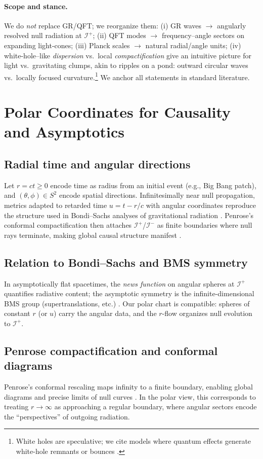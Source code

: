 \documentclass[12pt]{article}
\newcommand{\Iplus}{\mathcal{I}^+}
\newcommand{\Iminus}{\mathcal{I}^-}
\begin{document}
\paragraph{Scope and stance.}
We do \emph{not} replace GR/QFT; we reorganize them: (i) GR waves $\to$ angularly resolved null radiation at $\Iplus$; (ii) QFT modes $\to$ frequency–angle sectors on expanding light-cones; (iii) Planck scales $\to$ natural radial/angle units; (iv) white-hole–like \emph{dispersion} vs.\ local \emph{compactification} give an intuitive picture for light vs.\ gravitating clumps, akin to ripples on a pond: outward circular waves vs.\ locally focused curvature.\footnote{White holes are speculative; we cite models where quantum effects generate white-hole remnants or bounces \citep{deLorenzo2016}.} We anchor all statements in standard literature.

\section{Polar Coordinates for Causality and Asymptotics}
\subsection{Radial time and angular directions}
Let $r=ct\ge 0$ encode time as radius from an initial event (e.g., Big Bang patch), and $(\theta,\phi)\in S^2$ encode spatial directions. Infinitesimally near null propagation, metrics adapted to retarded time $u=t-r/c$ with angular coordinates reproduce the structure used in Bondi–Sachs analyses of gravitational radiation \citep{Bondi1962,Sachs1962,BMS,NullInfinity}. Penrose’s conformal compactification then attaches $\Iplus$/$\Iminus$ as finite boundaries where null rays terminate, making global causal structure manifest \citep{Penrose1964,NullInfinity,AsympFlat}.

\subsection{Relation to Bondi–Sachs and BMS symmetry}
In asymptotically flat spacetimes, the \emph{news function} on angular spheres at $\Iplus$ quantifies radiative content; the asymptotic symmetry is the infinite-dimensional BMS group (supertranslations, etc.) \citep{Bondi1962,Sachs1962,BMS}. Our polar chart is compatible: spheres of constant $r$ (or $u$) carry the angular data, and the $r$-flow organizes null evolution to $\Iplus$.

\subsection{Penrose compactification and conformal diagrams}
Penrose’s conformal rescaling maps infinity to a finite boundary, enabling global diagrams and precise limits of null curves \citep{Penrose1964,NullInfinity}. In the polar view, this corresponds to treating $r\!\to\!\infty$ as approaching a regular boundary, where angular sectors encode the ``perspectives'' of outgoing radiation.
\end{document}
